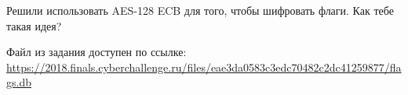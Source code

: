 
Решили использовать AES-128 ECB для того, чтобы шифровать флаги. Как тебе такая идея?

Файл из задания доступен по ссылке: \url{https://2018.finals.cyberchallenge.ru/files/eae3da0583c3edc70482c2dc41259877/flags.db}

